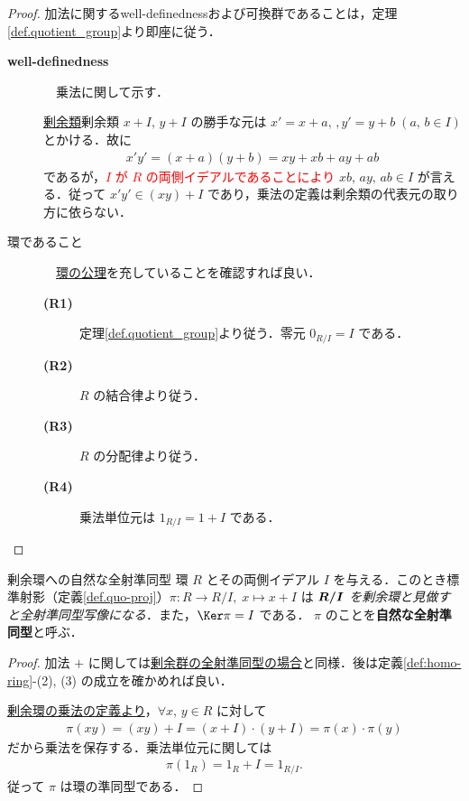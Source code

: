 \documentclass[geometry_main]{subfiles}
\begin{document}
\begin{proof}
	加法に関するwell-definednessおよび可換群であることは，定理\ref{def.quotient_group}より即座に従う．
	\begin{description}
		\item[\textbf{well-definedness}] 
		
		　乗法に関して示す．

		\hyperref[def.class_residue]{剰余類}剰余類 $x+I,\, y+I$ の勝手な元は $x' = x+a,\,, y' = y+b\; (a,\, b \in I)$ とかける．故に
		\begin{align}
			x'y' = (x+a)(y+b) = xy + xb + ay + ab
		\end{align}
		であるが，\textcolor{red}{$I$ が $R$ の両側イデアルであることにより} $xb,\, ay,\, ab \in I$ が言える．従って $x'y' \in (xy) + I$ であり，乗法の定義は剰余類の代表元の取り方に依らない．
		\item[環であること] 
		
		　\hyperref[ax:ring]{環の公理}を充していることを確認すれば良い．
		\begin{description}
			\item[\textbf{(R1)}] 定理\ref{def.quotient_group}より従う．零元 $0_{R/I} = I$ である．
			\item[\textbf{(R2)}] $R$ の結合律より従う．
			\item[\textbf{(R3)}] $R$ の分配律より従う．
			\item[\textbf{(R4)}] 乗法単位元は $1_{R/I} = 1+I$ である．
		\end{description}
	\end{description}
\end{proof}

\begin{mycol}[label=natural-homo-ring]{剰余環への自然な全射準同型}
	環 $R$ とその両側イデアル $I$ を与える．このとき標準射影（定義\ref{def.quo-proj}）$\pi \colon R \to R/I,\; x \mapsto x+I$ は\emph{ $\vb*{R/I}$ を剰余環と見做すと全射準同型写像になる}．また，$\Ker \pi = I$ である．
	$\pi$ のことを\textbf{自然な全射準同型}と呼ぶ．
\end{mycol}

\begin{proof}
	加法 $+$ に関しては\hyperref[natural-homo]{剰余群の全射準同型の場合}と同様．後は定義\ref{def:homo-ring}-(2), (3) の成立を確かめれば良い．

	\hyperref[def:quotient-ring]{剰余環の乗法の定義より}，$\forall x,\, y \in R$ に対して
	\begin{align}
		\pi(xy) = (xy) + I = (x+I) \cdot (y+I) = \pi(x) \cdot \pi(y)
	\end{align}
	だから乗法を保存する．乗法単位元に関しては
	\begin{align}
		\pi(1_R) = 1_R + I = 1_{R/I}.
	\end{align}
	従って $\pi$ は環の準同型である．
\end{proof}
\end{document}
